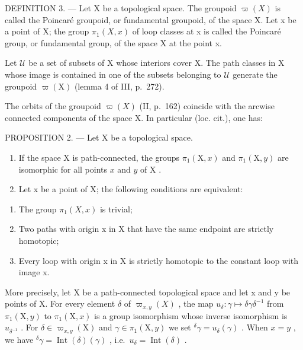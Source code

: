 DEFINITION 3. --- Let X be a topological space. The groupoid \(\varpi(X)\) is called the Poincaré groupoid, or fundamental groupoid, of the space X. Let x be a point of X; the group \(\pi_1(X,x)\) of loop classes at x is called the Poincaré group, or fundamental group, of the space X at the point x.

Let \(\mathcal{U}\) be a set of subsets of X whose interiors cover X. The path classes in X whose image is contained in one of the subsets belonging to \(\mathcal{U}\) generate the groupoid \(\varpi(\mathrm{X})\) (lemma 4 of III, p.~272).

The orbits of the groupoid \(\varpi(X)\) (II, p.~162) coincide with the arcwise connected components of the space X. In particular (loc. cit.), one has:

PROPOSITION 2. --- Let X be a topological space.

\begin{enumerate}
\def\labelenumi{\alph{enumi})}
\item
  If the space X is path-connected, the groups \(\pi_1(\mathrm{X},x)\) and \(\pi_1(\mathrm{X},y)\) are isomorphic for all points \(x\) and \(y\) of \(\mathrm{X}\) .
\item
  Let x be a point of X; the following conditions are equivalent:
\end{enumerate}

\begin{enumerate}
\def\labelenumi{(\roman{enumi})}
\item
  The group \(\pi_1(X,x)\) is trivial;
\item
  Two paths with origin x in X that have the same endpoint are strictly homotopic;
\item
  Every loop with origin x in X is strictly homotopic to the constant loop with image x.
\end{enumerate}

More precisely, let X be a path-connected topological space and let x and y be points of X. For every element \(\delta\) of \(\varpi_{x,y}(X)\) , the map \(u_{\delta} \colon \gamma \mapsto \delta \gamma \delta^{-1}\) from \(\pi_1(\mathrm{X},y)\) to \(\pi_1(\mathrm{X},x)\) is a group isomorphism whose inverse isomorphism is \(u_{\delta^{-1}}\) . For \(\delta \in \varpi_{x,y}(\mathrm{X})\) and \(\gamma \in \pi_1(\mathrm{X},y)\) we set \(^{\delta}\gamma = u_{\delta}(\gamma)\) . When \(x = y\) , we have \(^{\delta}\gamma = \operatorname{Int}(\delta)(\gamma)\) , i.e.~\(u_{\delta} = \operatorname{Int}(\delta)\) .

